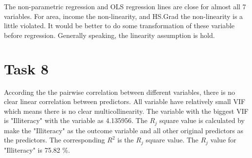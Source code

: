\documentclass[doc,biblatex,apacite]{apa6}
\begin{document}
The non-parametric regression and OLS regression lines are close for almost all 7 variables. 
For area, income the non-linearity, and HS.Grad the non-linearity is a little violated.
It would be better to do some transformation of these variable before regression.
Generally speaking, the linearity assumption is hold.

\section{Task 8}
According the the pairwise correlation between different variables, there is no clear linear correlation between predictors.
All variable have relatively small VIF which means there is no clear multicollinearity.
The variable with the biggest VIF is "Illiteracy" with the variable as 4.135956.
The $R_{j}$ square value is calculated by make the "Illiteracy" as the outcome variable and all other original predictors as the predictors. 
The corresponding $R^2$ is the $R_{j}$ square value.
The $R_{j}$ value for "Illiteracy" is 75.82 \%.
\end{document}
